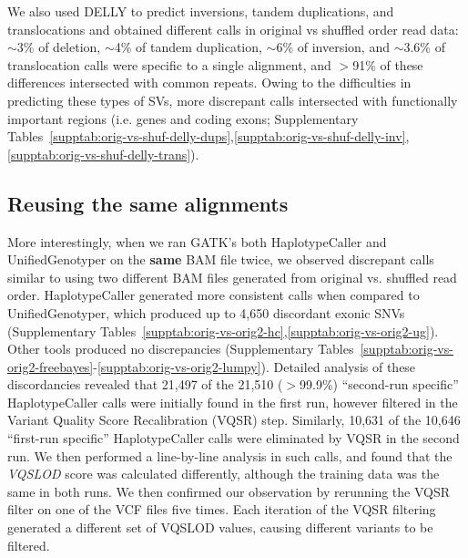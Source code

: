 \documentclass{bioinfo}
\begin{document}
\begin{methods}
We also used DELLY to predict inversions, tandem duplications, and translocations and obtained different calls in original vs shuffled order read data: $\sim$3\% of deletion, $\sim$4\% of tandem duplication, $\sim$6\% of inversion, and $\sim$3.6\% of translocation calls were specific to a single alignment, and $>$91\% of these differences intersected with common repeats. Owing to the difficulties in predicting
these types of SVs, more discrepant calls intersected with functionally important regions (i.e. genes and coding exons; Supplementary Tables~\ref{supptab:orig-vs-shuf-delly-dups},\ref{supptab:orig-vs-shuf-delly-inv},\ref{supptab:orig-vs-shuf-delly-trans}).

\subsection*{Reusing the same alignments}
More interestingly, when we ran GATK's both HaplotypeCaller and UnifiedGenotyper on the {\bf same} BAM file twice, we observed discrepant calls similar to using two different BAM files generated from original vs. shuffled read order. HaplotypeCaller generated more consistent calls when compared to UnifiedGenotyper, which produced up to 4,650 discordant exonic SNVs (Supplementary Tables~\ref{supptab:orig-vs-orig2-hc},\ref{supptab:orig-vs-orig2-ug}). Other tools produced no discrepancies (Supplementary Tables~\ref{supptab:orig-vs-orig2-freebayes}-\ref{supptab:orig-vs-orig2-lumpy}).
Detailed analysis of these discordancies revealed that  21,497 of the 21,510 ($>$99.9\%) ``second-run specific'' HaplotypeCaller calls were initially found in the first run, however filtered in the Variant Quality Score Recalibration (VQSR) step. Similarly, 10,631 of the 10,646 ``first-run specific'' HaplotypeCaller calls were eliminated by VQSR in the second run. We then performed a line-by-line analysis in such calls, and found that the {\it VQSLOD} score was calculated differently, although the training data was the same in both runs. We then confirmed our observation by rerunning the VQSR filter on 
one of the VCF files five times. Each iteration of the VQSR filtering generated a different set of VQSLOD values, causing different variants to be filtered.


\end{methods}
\end{document}
